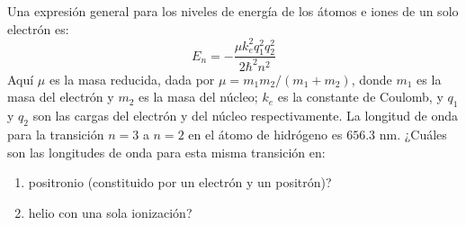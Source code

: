 \item Una expresión general para los niveles de energía de los átomos e iones de un solo electrón es:
$$ E_n = -\frac{\mu k_e^2 q_1^2 q_2^2}{2\hbar^2 n^2} $$
Aquí $\mu$ es la masa reducida, dada por $\mu = m_1 m_2 / (m_1 + m_2)$, donde $m_1$ es la masa del electrón y $m_2$ es la masa del núcleo; $k_e$ es la constante de Coulomb, y $q_1$ y $q_2$ son las cargas del electrón y del núcleo respectivamente. La longitud de onda para la transición $n = 3$ a $n = 2$ en el átomo de hidrógeno es $656.3\text{ nm}$. ¿Cuáles son las longitudes de onda para esta misma transición en:
\begin{enumerate}
    \item positronio (constituido por un electrón y un positrón)?
    \item helio con una sola ionización?
\end{enumerate}